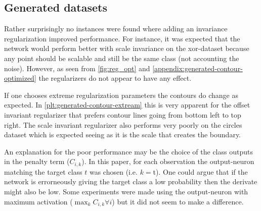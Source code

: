 \subsection{Generated datasets}
Rather surprisingly no instances were found where adding an invariance regularization improved performance. For instance, it was expected that the network would perform better with scale invariance on the xor-dataset because any point should be scalable and still be the same class (not accounting the noise). However, as seen from \cref{fig:reg_opt} and \cref{appendix:generated-contour-optimized} the regularizers do not appear to have any effect.

If one chooses extreme regularization parameters the contours do change as expected. In \cref{plt:generated-contour-extream} this is very apparent for the offset invariant regularizer that prefers contour lines going from bottom left to top right. The scale invariant regularizer also performs very poorly on the circles dataset which is expected seeing as it is the scale that creates the boundary.

An explanation for the poor performance may be the choice of the class outputs in the penalty term ($C_{i,k}$). In this paper, for each observation the output-neuron matching the target class $t$ was chosen (i.e. $k=$t). One could argue that if the network is errorneously giving the target class a low probability then the derivate might also be low. Some experiments were made using the output-neuron with maximum activation ($\max_k C_{i,k} \forall i$) but it did not seem to make a difference.
